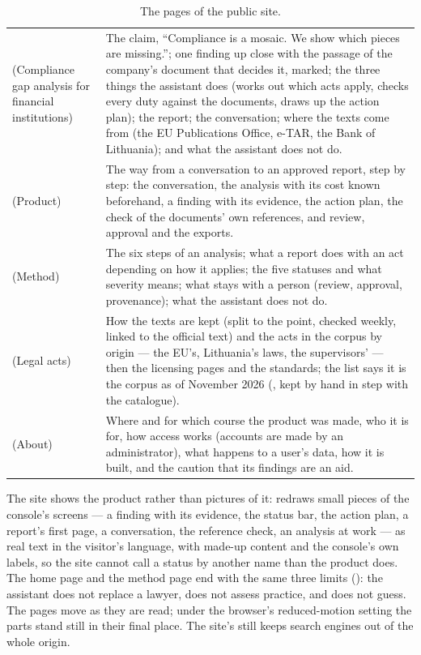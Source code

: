 \begin{table}[H]
\caption{The pages of the public site.}\label{tab:console:sitepages}
\begin{tabularx}{\textwidth}{@{}L{34mm}Y@{}}
\toprule
{} &  \\
\midrule
\code{/}  (Compliance gap analysis for financial
institutions) & The claim, \enquote{Compliance is a mosaic. We show which pieces are missing.};
one finding up close with the passage of the company's document that decides it, marked; the
three things the assistant does (works out which acts apply, checks every duty against the
documents, draws up the action plan); the report; the conversation; where the texts come from
(the EU Publications Office, e-TAR, the Bank of Lithuania); and what the assistant does not do. \\
  (Product) & The way from a conversation to an approved report,
step by step: the conversation, the analysis with its cost known beforehand, a finding with its
evidence, the action plan, the check of the documents' own references, and review, approval and
the exports. \\
  (Method) & The six steps of an analysis; what a report does with an
act depending on how it applies; the five statuses and what severity means; what stays with a
person (review, approval, provenance); what the assistant does not do. \\
  (Legal acts) & How the texts are kept (split to the point,
checked weekly, linked to the official text) and the acts in the corpus by origin --- the EU's,
Lithuania's laws, the supervisors' --- then the licensing pages and the standards; the list says
it is the corpus as of November 2026 (, kept by hand in step with the
catalogue). \\
  (About) & Where and for which course the product was made, who it is for,
how access works (accounts are made by an administrator), what happens to a user's data, how it
is built, and the caution that its findings are an aid. \\
\bottomrule
\end{tabularx}
\end{table}

The site shows the product rather than pictures of it:  redraws small
pieces of the console's screens --- a finding with its evidence, the status bar, the action plan,
a report's first page, a conversation, the reference check, an analysis at work --- as real text
in the visitor's language, with made-up content and the console's own labels, so the site cannot
call a status by another name than the product does. The home page and the method page end with
the same three limits (): the assistant does not replace a lawyer, does not
assess practice, and does not guess. The pages move as they are read; under the browser's
reduced-motion setting the parts stand still in their final place. The site's  still keeps search engines out of the whole
origin.

